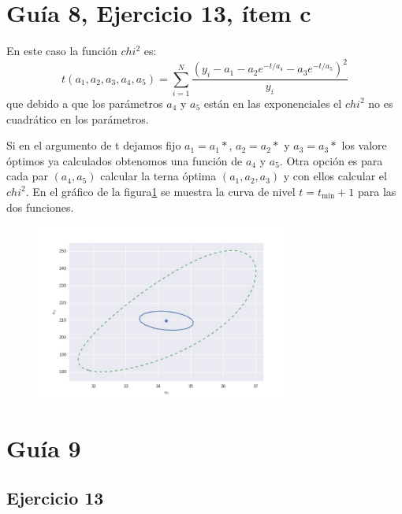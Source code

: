 \section*{Guía 8, Ejercicio 13, ítem c}
En este caso la función $chi^2$ es:
$$
t(a_1, a_2, a_3, a_4, a_5) = \sum_{i=1}^N \frac{{\left(y_i-a_1 - a_2 e^{-t/a_4} - a_3 e^{-t/a_5}\right)}^2}{y_i}
$$
que debido a que los parámetros $a_4$ y $a_5$ están en las exponenciales el $chi^2$ no es cuadrático en los parámetros.

Si en el argumento de t dejamos fijo $a_1=a_1*$, $a_2=a_2*$ y $a_3=a_3*$ los valore óptimos ya calculados obtenomos una función de $a_4$ y $a_5$.
 Otra opción es para cada par $(a_4, a_5)$ calcular la terna óptima $(a_1, a_2, a_3)$ y con ellos calcular el $chi^2$.
 En el gráfico de la figura\ref{fig:fig1} se muestra la curva de nivel $t=t_{\min} + 1$ para las dos funciones.

\begin{figure}
\centering
\includegraphics[width=0.75\textwidth]{fig1.jpg}
\caption[]{}
\label{fig:fig1}
\end{figure}


\section*{Guía 9}
\subsection*{Ejercicio 13}
